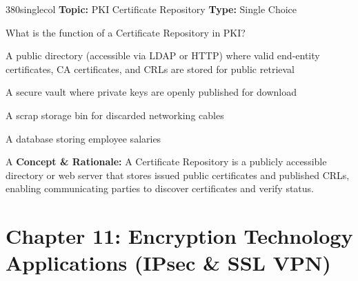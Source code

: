 \begin{qcard}{380}{singlecol}
\textcolor{darkslate!75}{\small\textbf{Topic:} PKI Certificate Repository \hfill \textbf{Type:} Single Choice}\vspace{0.4em}\par
What is the function of a Certificate Repository in PKI?
\begin{qoptions}
\item A public directory (accessible via LDAP or HTTP) where valid end-entity certificates, CA certificates, and CRLs are stored for public retrieval
\item A secure vault where private keys are openly published for download
\item A scrap storage bin for discarded networking cables
\item A database storing employee salaries
\end{qoptions}
\end{qcard}
\nopagebreak
\begin{explainbox}{A}
\textbf{Concept \& Rationale:} A Certificate Repository is a publicly accessible directory or web server that stores issued public certificates and published CRLs, enabling communicating parties to discover certificates and verify status.
\end{explainbox}

\section{Chapter 11: Encryption Technology Applications (IPsec \& SSL VPN)}

